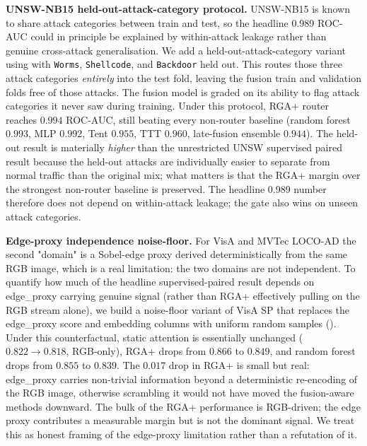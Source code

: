 \documentclass[10pt,conference]{IEEEtran}
\newcommand{\methodplus}{RGA+}
\begin{document}
\noindent\textbf{UNSW-NB15 held-out-attack-category protocol.}
UNSW-NB15 is known to share attack categories between train and test,
so the headline 0.989 ROC-AUC could in principle be explained by
within-attack leakage rather than genuine cross-attack generalisation.
We add a held-out-attack-category variant using
 with
\texttt{Worms}, \texttt{Shellcode}, and \texttt{Backdoor} held out. This routes
those three attack categories
\emph{entirely} into the test fold, leaving the fusion train and
validation folds free of those attacks. The fusion model is graded
on its ability to flag attack categories it never saw during
training. Under this protocol, \methodplus{} router reaches
$0.994$ ROC-AUC, still beating every non-router baseline
(random forest $0.993$, MLP $0.992$, Tent $0.955$, TTT $0.960$,
late-fusion ensemble $0.944$). The held-out result is materially
\emph{higher} than the unrestricted UNSW supervised paired result
because the held-out attacks are individually easier to separate from
normal traffic than the original mix; what matters is that the
\methodplus{} margin over the strongest non-router baseline is
preserved. The headline 0.989 number therefore does not depend on
within-attack leakage; the gate also wins on unseen attack
categories.

\noindent\textbf{Edge-proxy independence noise-floor.}
For VisA and MVTec LOCO-AD the second "domain" is a Sobel-edge proxy
derived deterministically from the same RGB image, which is a real
limitation: the two domains are not independent. To quantify how much
of the headline supervised-paired result depends on edge\_proxy
carrying genuine signal (rather than RGA+ effectively pulling on the
RGB stream alone), we build a noise-floor variant of VisA SP that
replaces the edge\_proxy score and embedding columns with uniform
random samples
(). Under this
counterfactual, static attention is essentially unchanged
($0.822 \to 0.818$, RGB-only), \methodplus{} drops from $0.866$ to
$0.849$, and random forest drops from $0.855$ to $0.839$. The
$0.017$ drop in \methodplus{} is small but real: edge\_proxy
carries non-trivial information beyond a deterministic re-encoding of
the RGB image, otherwise scrambling it would not have moved the
fusion-aware methods downward. The bulk of the \methodplus{}
performance is RGB-driven; the edge proxy contributes a measurable
margin but is not the dominant signal. We treat this as
honest framing of the edge-proxy limitation rather than a refutation
of it.
\end{document}
